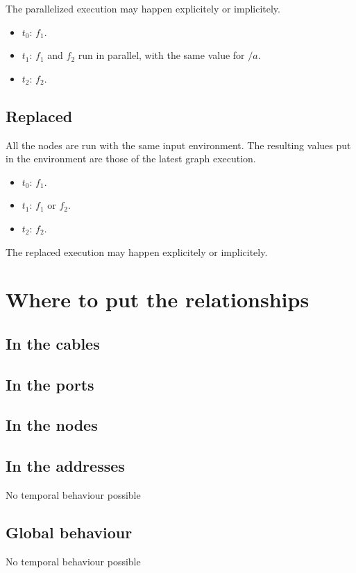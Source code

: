 \documentclass{article}
\begin{document}
    The parallelized execution may happen explicitely or implicitely.

    \begin{itemize}
        \item $t_0$: $f_1$.
        \item $t_1$: $f_1$ and $f_2$ run in parallel, with the same value for $/a$.
        \item $t_2$: $f_2$. 
    \end{itemize}
     
	\subsection{Replaced}
	All the nodes are run with the same input environment. 
	The resulting values put in the environment are those of the latest graph execution.
	 
    \begin{itemize}
        \item $t_0$: $f_1$.
        \item $t_1$: $f_1$ or $f_2$.
        \item $t_2$: $f_2$. 
    \end{itemize}

    The replaced execution may happen explicitely or implicitely.
    
    \section{Where to put the relationships}
    \subsection{In the cables}
    \subsection{In the ports}
    \subsection{In the nodes}
    \subsection{In the addresses}
    No temporal behaviour possible
    \subsection{Global behaviour}
    No temporal behaviour possible
\end{document}
